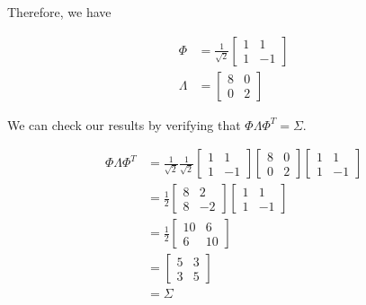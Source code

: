 \documentclass[a4paper, 10pt, twoside]{article}
\begin{document}
\begin{enumerate}[a)]
          Therefore, we have

          \begin{align*}
              \Phi    & = \frac{1}{\sqrt{2}}\begin{bmatrix}1&1\\1&-1\end{bmatrix} \\
              \Lambda & = \begin{bmatrix}8&0\\0&2\end{bmatrix}
          \end{align*}

          We can check our results by verifying that $\Phi \Lambda \Phi^T = \Sigma$.

          \begin{align*}
              \Phi \Lambda \Phi^T & = \frac{1}{\sqrt{2}}\frac{1}{\sqrt{2}}\begin{bmatrix}1&1\\1&-1\end{bmatrix}\begin{bmatrix}8&0\\0&2\end{bmatrix}\begin{bmatrix}1&1\\1&-1\end{bmatrix} \\
                                  & = \frac{1}{2}\begin{bmatrix}8&2\\8&-2\end{bmatrix}\begin{bmatrix}1&1\\1&-1\end{bmatrix}                                                    \\
                                  & = \frac{1}{2}\begin{bmatrix}10&6\\6&10\end{bmatrix}                                                                              \\
                                  & = \begin{bmatrix}5&3\\3&5\end{bmatrix}                                                                                         \\
                                  & = \Sigma

\end{align*}
\end{enumerate}
\end{document}
